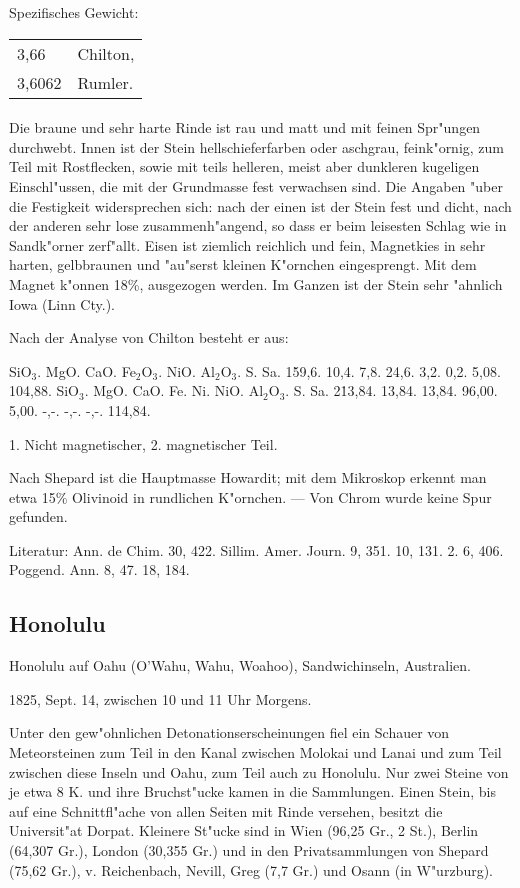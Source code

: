 \documentclass[a4paper, 11pt, oneside]{article}
\begin{document}
Spezifisches Gewicht:
\begin{table}[!ht]
    \centering
    \begin{tabular}{l l}
        3,66 & Chilton,\\
        3,6062 & Rumler.
    \end{tabular}
\end{table}
\paragraph{}
Die braune und sehr harte Rinde ist rau und matt und mit feinen Spr"ungen durchwebt. Innen ist der Stein hellschieferfarben oder aschgrau, feink"ornig, zum Teil mit Rostflecken, sowie mit teils helleren, meist aber dunkleren kugeligen Einschl"ussen, die mit der Grundmasse fest verwachsen sind. Die Angaben "uber die Festigkeit widersprechen sich: nach der einen ist der Stein fest und dicht, nach der anderen sehr lose zusammenh"angend, so dass er beim leisesten Schlag wie in Sandk"orner zerf"allt. Eisen ist ziemlich reichlich und fein, Magnetkies in sehr harten, gelbbraunen und "au"serst kleinen K"ornchen eingesprengt. Mit dem Magnet k"onnen 18\%, ausgezogen werden. Im Ganzen ist der Stein sehr "ahnlich Iowa (Linn Cty.).

Nach der Analyse von Chilton besteht er aus:

SiO$_{3}$. MgO. CaO. Fe$_{2}$O$_{3}$. NiO. Al$_{2}$O$_{3}$. S. Sa.  
1\. 59,6. 10,4. 7,8. 24,6. 3,2. 0,2. 5,08. 104,88.  
SiO$_{3}$. MgO. CaO. Fe. Ni. NiO. Al$_{2}$O$_{3}$. S. Sa.  
2\. 13,84. 13,84. 13,84. 96,00. 5,00. -,-. -,-. -,-. 114,84.

1. Nicht magnetischer, 2. magnetischer Teil.

Nach Shepard ist die Hauptmasse Howardit; mit dem Mikroskop erkennt man etwa 15\% Olivinoid in rundlichen K"ornchen. --- Von Chrom wurde keine Spur gefunden.

Literatur: Ann. de Chim. 30, 422. Sillim. Amer. Journ. 9, 351. 10, 131. 2. 6, 406. Poggend. Ann. 8, 47. 18, 184.

\subsection{Honolulu}

Honolulu auf Oahu (O'Wahu, Wahu, Woahoo), Sandwichinseln, Australien.

1825, Sept. 14, zwischen 10 und 11 Uhr Morgens.

Unter den gew"ohnlichen Detonationserscheinungen fiel ein Schauer von Meteorsteinen zum Teil in den Kanal zwischen Molokai und Lanai und zum Teil zwischen diese Inseln und Oahu, zum Teil auch zu Honolulu. Nur zwei Steine von je etwa 8 K. und ihre Bruchst"ucke kamen in die Sammlungen. Einen Stein, bis auf eine Schnittfl"ache von allen Seiten mit Rinde versehen, besitzt die Universit"at Dorpat. Kleinere St"ucke sind in Wien (96,25 Gr., 2 St.), Berlin (64,307 Gr.), London (30,355 Gr.) und in den Privatsammlungen von Shepard (75,62 Gr.), v. Reichenbach, Nevill, Greg (7,7 Gr.) und Osann (in W"urzburg).
\end{document}
